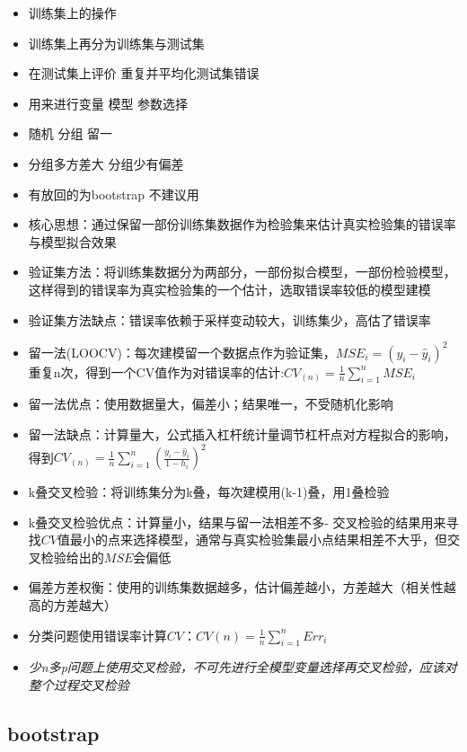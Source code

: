 \documentclass[]{book}
\begin{document}
\begin{itemize}
\item
  训练集上的操作
\item
  训练集上再分为训练集与测试集
\item
  在测试集上评价 重复并平均化测试集错误
\item
  用来进行变量 模型 参数选择
\item
  随机 分组 留一
\item
  分组多方差大 分组少有偏差
\item
  有放回的为bootstrap 不建议用
\item
  核心思想：通过保留一部份训练集数据作为检验集来估计真实检验集的错误率与模型拟合效果
\item
  验证集方法：将训练集数据分为两部分，一部份拟合模型，一部份检验模型，这样得到的错误率为真实检验集的一个估计，选取错误率较低的模型建模
\item
  验证集方法缺点：错误率依赖于采样变动较大，训练集少，高估了错误率
\item
  留一法(LOOCV)：每次建模留一个数据点作为验证集，\(MSE_i = (y_i - \hat y_i)^2\)重复n次，得到一个CV值作为对错误率的估计:\(CV_{(n)} = \frac{1}{n} \sum_{i = 1}^{n} MSE_i\)
\item
  留一法优点：使用数据量大，偏差小；结果唯一，不受随机化影响
\item
  留一法缺点：计算量大，公式插入杠杆统计量调节杠杆点对方程拟合的影响，得到\(CV_{(n)} = \frac{1}{n} \sum_{i = 1}^{n} (\frac{y_i - \hat y_i}{1 - h_i})^2\)
\item
  k叠交叉检验：将训练集分为k叠，每次建模用(k-1)叠，用1叠检验
\item
  k叠交叉检验优点：计算量小，结果与留一法相差不多- 交叉检验的结果用来寻找\(CV\)值最小的点来选择模型，通常与真实检验集最小点结果相差不大乎，但交叉检验给出的\(MSE\)会偏低
\item
  偏差方差权衡：使用的训练集数据越多，估计偏差越小，方差越大（相关性越高的方差越大）
\item
  分类问题使用错误率计算\(CV\)：\(CV{(n)} = \frac{1}{n} \sum_{i = 1}^{n} Err_{i}\)
\item
  \emph{少n多p问题上使用交叉检验，不可先进行全模型变量选择再交叉检验，应该对整个过程交叉检验}
\end{itemize}

\hypertarget{bootstrap}{%
\subsection{bootstrap}\label{bootstrap}}
\end{document}
